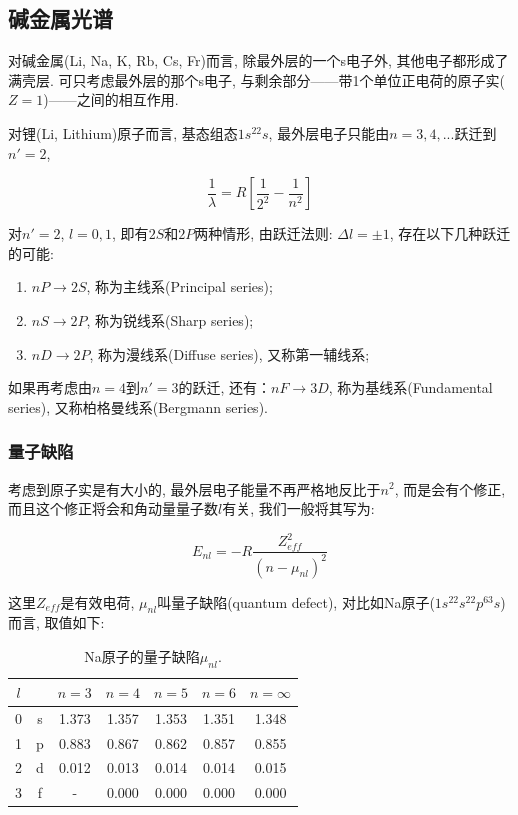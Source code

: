 \subsection{碱金属光谱}


对碱金属(Li, Na, K, Rb, Cs, Fr)而言, 除最外层的一个s电子外,
其他电子都形成了满壳层. 可只考虑最外层的那个s电子,
与剩余部分——带1个单位正电荷的原子实($Z=1$)——之间的相互作用.

对锂(Li, Lithium)原子而言, 基态组态$1s^22s$,
最外层电子只能由$n=3,4,...$跃迁到$n'=2$,

\begin{equation*}
\frac{1}{\lambda} = R \left[ \frac{1}{2^2} - \frac{1}{n^2} \right]
\end{equation*}

对$n'=2$, $l=0, 1$, 即有$2S$和$2P$两种情形, 由跃迁法则: $\Delta l =
\pm 1$, 存在以下几种跃迁的可能:

\begin{enumerate}
  \item $nP \to 2S$, 称为主线系(Principal series);
  \item $nS \to 2P$, 称为锐线系(Sharp series);
  \item $nD \to 2P$, 称为漫线系(Diffuse series), 又称第一辅线系;
\end{enumerate}

如果再考虑由$n=4$到$n'=3$的跃迁, 还有：$nF \to 3D$,
称为基线系(Fundamental series), 又称柏格曼线系(Bergmann series).

\subsubsection{量子缺陷}

考虑到原子实是有大小的, 最外层电子能量不再严格地反比于$n^2$,
而是会有个修正, 而且这个修正将会和角动量量子数$l$有关,
我们一般将其写为:

\begin{equation*}
E_{nl}=-R\frac{Z_{eff}^2}{(n-\mu_{nl})^2}
\end{equation*}

这里$Z_{eff}$是有效电荷, $\mu_{nl}$叫量子缺陷(quantum defect),
对比如Na原子($1s^22s^22p^63s$)而言, 取值如下:


\begin{table}[h]
  \centering
\begin{tabular}{|c|c|c|c|c|c|c|}
  \hline
  $l$ & {} & $n=3$ & $n=4$ & $n=5$ & $n=6$ & $n=\infty$ \\
  \hline
  0 & s & 1.373 & 1.357 & 1.353 & 1.351 & 1.348 \\
  1 & p & 0.883 & 0.867 & 0.862 & 0.857 & 0.855 \\
  2 & d & 0.012 & 0.013 & 0.014 & 0.014 & 0.015 \\
  3 & f & - & 0.000 & 0.000 & 0.000 & 0.000 \\
  \hline
\end{tabular}
  \caption{Na原子的量子缺陷$\mu_{nl}$.}\label{quantum defects for sodium atoms}
\end{table}

